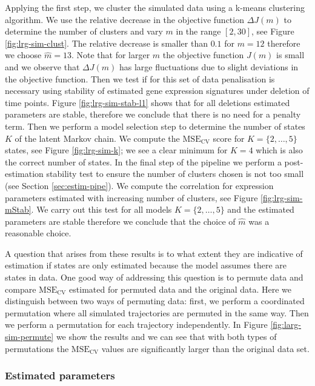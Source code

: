 Applying the first step, we cluster the simulated data using a k-means clustering algorithm. We use the relative decrease in the objective function $\Delta J(m)$ to determine the number of clusters and vary $m$ in the range $[2, 30]$, see Figure \ref{fig:lrg-sim-clust}. The relative decrease is smaller than $0.1$ for $m=12$ therefore we choose $\hat{m} = 13$. Note that for larger $m$ the objective function $J(m)$ is small and we observe that $\Delta J(m)$ has large fluctuations due to slight deviations in the objective function. Then we test if for this set of data penalisation is necessary using stability of estimated gene expression signatures under deletion of time points. Figure \ref{fig:lrg-sim-stab-l1} shows that for all deletions estimated parameters are stable, therefore we conclude that there is no need for a penalty term. Then we perform a model selection step to determine the number of states $K$ of the latent Markov chain. We compute the $\mathrm{MSE_{CV}}$ score for $K=\lbrace 2, \ldots, 5 \rbrace$ states, see Figure \ref{fig:lrg-sim-k}; we see a clear minimum for $K=4$ which is also the correct number of states. In the final step of the pipeline we perform a post-estimation stability test to ensure the number of clusters chosen is not too small (see Section \ref{sec:estim-pipe}). We compute the correlation for expression parameters estimated with increasing number of clusters, see Figure \ref{fig:lrg-sim-mStab}. We carry out this test for all models $K = \lbrace 2, \ldots, 5\rbrace $ and the estimated parameters are stable therefore we conclude that the choice of $\hat{m}$ was a reasonable choice.

A question that arises from these results is to what extent they are indicative of estimation if states are only estimated because the model assumes there are states in data. One good way of addressing this question is to permute data and compare  $\mathrm{MSE_{CV}}$ estimated for permuted data and the original data. Here we distinguish between two ways of permuting data: first, we perform a coordinated permutation where all simulated trajectories are permuted in the same way. Then we perform a permutation for each trajectory independently. In Figure \ref{fig:larg-sim-permute} we show the results and we can see that with both types of permutations the $\mathrm{MSE_{CV}}$ values are significantly larger than the original data set.


\subsubsection{Estimated parameters}
\label{sec:transition-rates}

